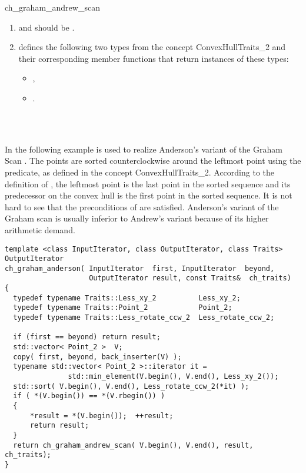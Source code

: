 \begin{ccRefFunction}{ch_graham_andrew_scan}
\begin{enumerate}
   \item    {} and 
            should be .
   \item    {} defines the following two types from
            the concept ConvexHullTraits\_2 and their corresponding member
            functions that return instances of these types:
            \begin{itemize}
                \item {},
                \item {}.
            \end{itemize}
\end{enumerate}


\ccSeeAlso

 \\
 \\

\ccExample

In the following example  is used to
realize Anderson's variant \cite{a-readc-78} of the Graham Scan 
\cite{g-eadch-72}.  The points are sorted counterclockwise around the leftmost 
point using the  predicate, as defined in
the concept ConvexHullTraits\_2. According to the definition 
of , the leftmost point is the last point in the sorted 
sequence and its predecessor on the convex hull is the first point in the 
sorted sequence.  It is not hard to see that the preconditions of
 are satisfied.  Anderson's variant of the 
Graham scan is usually inferior to Andrew's variant because of its higher 
arithmetic demand.

\begin{verbatim}
template <class InputIterator, class OutputIterator, class Traits>
OutputIterator
ch_graham_anderson( InputIterator  first, InputIterator  beyond,
                    OutputIterator result, const Traits&  ch_traits)
{
  typedef typename Traits::Less_xy_2          Less_xy_2;
  typedef typename Traits::Point_2            Point_2;
  typedef typename Traits::Less_rotate_ccw_2  Less_rotate_ccw_2;

  if (first == beyond) return result;
  std::vector< Point_2 >  V;
  copy( first, beyond, back_inserter(V) );
  typename std::vector< Point_2 >::iterator it = 
               std::min_element(V.begin(), V.end(), Less_xy_2());
  std::sort( V.begin(), V.end(), Less_rotate_ccw_2(*it) );
  if ( *(V.begin()) == *(V.rbegin()) )
  {
      *result = *(V.begin());  ++result;
      return result;
  }
  return ch_graham_andrew_scan( V.begin(), V.end(), result, ch_traits);
}
\end{verbatim}



\end{ccRefFunction}
